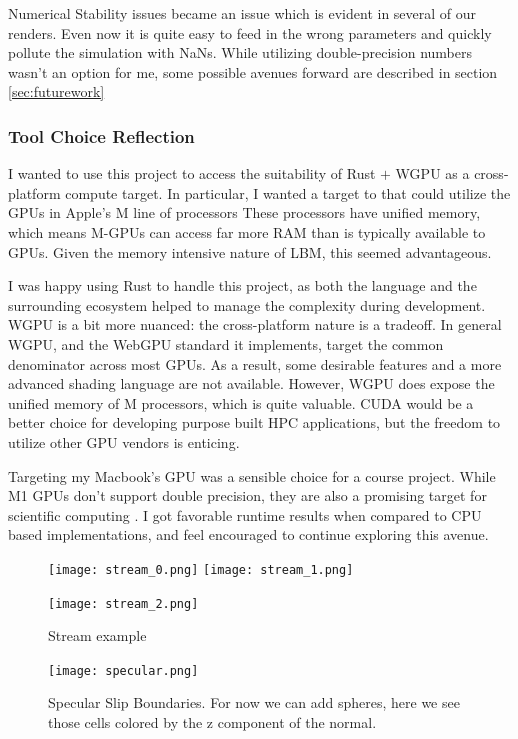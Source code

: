 Numerical Stability issues became an issue which
is evident in several of our renders.
Even now it is quite easy to feed in the wrong parameters
and quickly pollute the simulation with NaNs.
While utilizing double-precision numbers wasn't an option for me,
some possible avenues forward are described 
in section \ref{sec:futurework}

\subsubsection{Tool Choice Reflection}
I wanted to use this project to access the suitability of Rust $+$ WGPU 
as a cross-platform compute target.
In particular, I wanted a target to that could utilize 
the GPUs in Apple's M line of processors
These processors have unified memory, which means
M-GPUs can access far more RAM than is typically available to GPUs.
Given the memory intensive nature of LBM, this seemed advantageous.

I was happy using Rust to handle this project, as both the 
language and the surrounding ecosystem helped to manage
the complexity during development.
WGPU is a bit more nuanced: the cross-platform nature
is a tradeoff. In general WGPU, 
and the WebGPU standard it implements,
target the common denominator across most GPUs.
As a result, some desirable features and a more advanced
shading language are not available.
However, WGPU does expose the unified memory of M processors,
which is quite valuable.
CUDA would be a better choice 
for developing purpose built HPC
applications, but the freedom to utilize other GPU vendors is enticing.

Targeting my Macbook's GPU was a sensible choice for a course project.
While M1 GPUs don't support double precision, 
they are also a promising target for scientific computing \cite{Kenyon2022}.
I got favorable runtime results when compared to CPU based implementations,
and feel encouraged to continue exploring this avenue.

\begin{figure}
  \begin{center}
    \texttt{[image: stream\_0.png]}
    \texttt{[image: stream\_1.png]}

    \texttt{[image: stream\_2.png]}
  \end{center}
  \caption{Stream example}
\end{figure}

\begin{figure}
  \begin{center}
    \texttt{[image: specular.png]}
  \end{center}
  \caption{Specular Slip Boundaries.
For now we can add spheres, here we see those cells colored by the z component of the normal.}
\end{figure}
